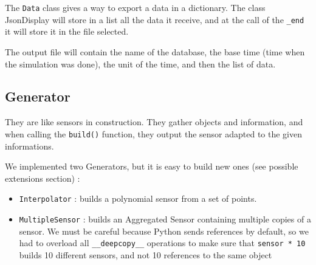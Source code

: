 The \verb!Data! class gives a way to export a data in a dictionary. The class JsonDisplay will store in a list all the data it receive, and at the call of the \verb!_end! it will store it in the file selected.

The output file will contain the name of the database, the base time (time when the simulation was done), the unit of the time, and then the list of data.


\subsection{Generator}

They are like sensors in construction. They gather objects and information, and
when calling the \verb!build()! function, they output the sensor adapted to the
given informations.

We implemented two Generators, but it is easy to build new ones (see possible
extensions section) :
\begin{itemize}
    \item \verb!Interpolator! : builds a polynomial sensor from a set of points.
    \item \verb!MultipleSensor! : builds an Aggregated Sensor containing
multiple copies of a sensor. We must be careful because Python sends references
by default, so we had to overload all \verb!__deepcopy__! operations to make
sure that \verb!sensor * 10! builds 10 different sensors, and not 10 references
to the same object
\end{itemize}
